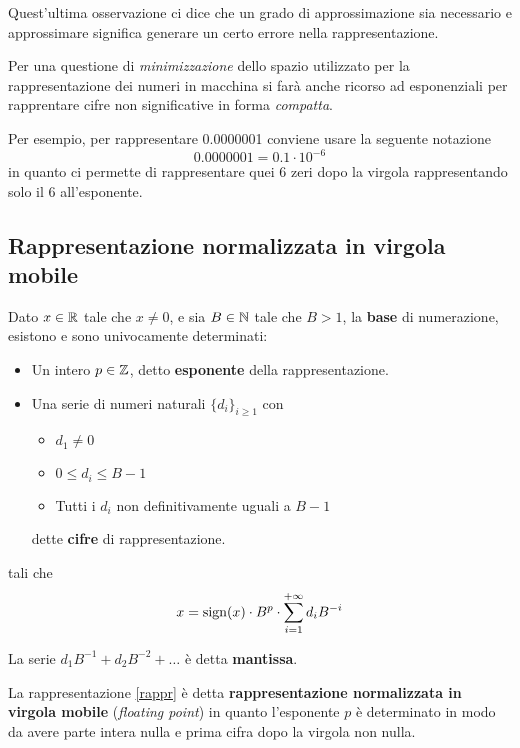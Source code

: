 Quest'ultima osservazione ci dice che un grado di approssimazione sia necessario e approssimare significa
generare un certo errore nella rappresentazione.

Per una questione di \emph{minimizzazione} dello spazio utilizzato per la rappresentazione dei numeri in
macchina si farà anche ricorso ad esponenziali per rapprentare cifre non significative in forma \emph{compatta}.

\begin{example}
	Per esempio, per rappresentare 0.0000001 conviene usare la seguente notazione
	\[ 0.0000001 = 0.1 \cdot 10^{-6} \]
	in quanto ci permette di rappresentare quei 6 zeri dopo la virgola rappresentando solo il 6 all'esponente.
\end{example}

\subsection{Rappresentazione normalizzata in virgola mobile}
\begin{theorem}[Rappresentazione]\label{th: rappr}
	Dato $x \in \mathbb{R}$ tale che $x \neq 0$, e sia $B \in \mathbb{N}$ tale che $B > 1$, la \textbf{base} di numerazione,
	esistono e sono univocamente determinati:
	\begin{itemize}
		\item Un intero $p \in \mathbb{Z}$, detto \textbf{esponente} della rappresentazione.
		\item Una serie di numeri naturali $\{ d_i \}_{i \geq 1}$ con
		      \begin{itemize}
			      \item $d_1 \neq 0$
			      \item $0 \leq d_i \leq B - 1$
			      \item Tutti i $d_i$ non definitivamente uguali a $B - 1$
		      \end{itemize}
		      dette \textbf{cifre} di rappresentazione.
	\end{itemize}
	tali che
	\begin{equation}\label{rappr}
		x = \operatorname{sign}(x) \cdot B^p \cdot \sum_{i=1}^{+\infty} d_i B^{-i}
	\end{equation}
\end{theorem}

\begin{definition}
	La serie $d_1 B^{-1} + d_2 B^{-2} + \dots$ è detta \textbf{mantissa}.
\end{definition}

La rappresentazione \ref{rappr} è detta \textbf{rappresentazione normalizzata in virgola mobile}
(\emph{floating point}) in quanto l'esponente $p$ è determinato in modo da avere parte intera nulla e prima
cifra dopo la virgola non nulla.

